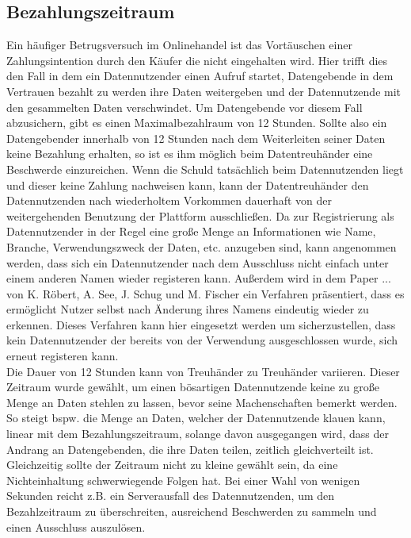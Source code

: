 \documentclass[11pt,a4paper]{scrreprt}
\begin{document}
\subsection{Bezahlungszeitraum}
\label{subsec:paymentTimespan}
Ein häufiger Betrugsversuch im Onlinehandel ist das Vortäuschen einer Zahlungsintention durch den Käufer die nicht eingehalten wird. Hier trifft dies den Fall in dem ein Datennutzender einen Aufruf startet, Datengebende in dem Vertrauen bezahlt zu werden ihre Daten weitergeben und der Datennutzende mit den gesammelten Daten verschwindet. Um Datengebende vor diesem Fall abzusichern, gibt es einen Maximalbezahlraum von 12 Stunden. Sollte also ein Datengebender innerhalb von 12 Stunden nach dem Weiterleiten seiner Daten keine Bezahlung erhalten, so ist es ihm möglich beim Datentreuhänder eine Beschwerde einzureichen. Wenn die Schuld tatsächlich beim Datennutzenden liegt und dieser keine Zahlung nachweisen kann, kann der Datentreuhänder den Datennutzenden nach wiederholtem Vorkommen dauerhaft von der weitergehenden Benutzung der Plattform ausschließen. Da zur Registrierung als Datennutzender in der Regel eine große Menge an Informationen wie Name, Branche, Verwendungszweck der Daten, etc. anzugeben sind, kann angenommen werden, dass sich ein Datennutzender nach dem Ausschluss nicht einfach unter einem anderen Namen wieder registeren kann. Außerdem wird in dem Paper ... von K. Röbert, A. See, J. Schug und M. Fischer ein Verfahren präsentiert, dass es ermöglicht Nutzer selbst nach Änderung ihres Namens eindeutig wieder zu erkennen. Dieses Verfahren kann hier eingesetzt werden um sicherzustellen, dass kein Datennutzender der bereits von der Verwendung ausgeschlossen wurde, sich erneut registeren kann.\\

Die Dauer von 12 Stunden kann von Treuhänder zu Treuhänder variieren. Dieser Zeitraum wurde gewählt, um einen bösartigen Datennutzende keine zu große Menge an Daten stehlen zu lassen, bevor seine Machenschaften bemerkt werden. So steigt bspw. die Menge an Daten, welcher der Datennutzende klauen kann, linear mit dem Bezahlungszeitraum, solange davon ausgegangen wird, dass der Andrang an Datengebenden, die ihre Daten teilen, zeitlich gleichverteilt ist. Gleichzeitig sollte der Zeitraum nicht zu kleine gewählt sein, da eine Nichteinhaltung schwerwiegende Folgen hat. Bei einer Wahl von wenigen Sekunden reicht z.B. ein Serverausfall des Datennutzenden, um den Bezahlzeitraum zu überschreiten, ausreichend Beschwerden zu sammeln und einen Ausschluss auszulösen.
\end{document}
